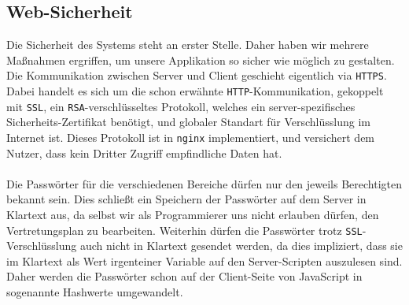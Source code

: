 \subsection{Web-Sicherheit}
Die Sicherheit des Systems steht an erster Stelle. Daher haben wir mehrere Maßnahmen ergriffen,
um unsere Applikation so sicher wie möglich zu gestalten. Die Kommunikation zwischen Server
und Client geschieht eigentlich via \texttt{HTTPS}. Dabei handelt es sich um die schon erwähnte
\texttt{HTTP}-Kommunikation, gekoppelt mit \texttt{SSL}, ein \texttt{RSA}-verschlüsseltes Protokoll,
welches ein server-spezifisches Sicherheits-Zertifikat benötigt, und globaler Standart für
Verschlüsslung im Internet ist. Dieses Protokoll ist in \texttt{nginx} implementiert, und versichert
dem Nutzer, dass kein Dritter Zugriff empfindliche Daten hat.\\\\
Die Passwörter für die verschiedenen Bereiche dürfen nur den jeweils Berechtigten bekannt sein. Dies
schließt ein Speichern der Passwörter auf dem Server in Klartext aus, da selbst wir als Programmierer
uns nicht erlauben dürfen, den Vertretungsplan zu bearbeiten. Weiterhin dürfen die Passwörter trotz
\texttt{SSL}-Verschlüsslung auch nicht in Klartext gesendet werden, da dies impliziert, dass sie im
Klartext als Wert irgenteiner Variable auf den Server-Scripten auszulesen sind. Daher werden die
Passwörter schon auf der Client-Seite von JavaScript in sogenannte Hashwerte umgewandelt.

